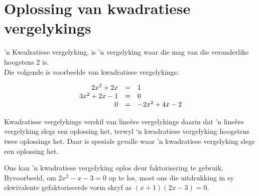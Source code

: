 \section{Oplossing van kwadratiese vergelykings}

’n Kwadratiese vergelyking, is ’n vergelyking waar die mag van die veranderlike hoogstens
$2$ is. \\Die volgende is voorbeelde van kwadratiese vergelykings:\par 


\begin{equation*}
    \begin{array}{ccl}\hfill 2{x}^{2}+2x& =& 1\hfill \\
	\hfill 3{x}^{2}+2x-1&=&0 \\ 
	\hfill 0&=&-2{x}^{2}+4x-2\hfill 
    \end{array}
\end{equation*}

Kwadratiese vergelykings verskil van lineêre vergelykings daarin dat ’n lineêre vergelyking slegs een oplossing
het, terwyl ‘n kwadratiese vergelyking hoogstens twee oplossings het. Daar is spesiale gevalle waar ’n kwadratiese
vergelyking slegs een oplossing het.\par


Ons kan 'n kwadratiese vergelyking oplos deur faktorisering te gebruik. Byvoorbeeld, om $2{x}^{2}-x-3 = 0$ op te los, moet ons die uitdrukking in sy ekwivalente gefaktoriseerde vorm skryf as $(x+1)(2x-3)=0$.\par




